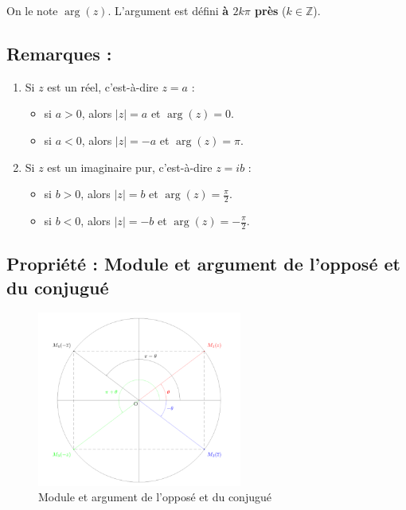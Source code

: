 \documentclass[a4paper,12pt]{article}
\begin{document}
    On le note $\arg(z)$. L’argument est défini \textbf{à $2k\pi$ près} ($k \in \mathbb{Z}$).

    \subsection{Remarques :}
    \begin{enumerate}
        \item Si $z$ est un réel, c’est-à-dire $z = a$ :
        \begin{itemize}
            \item si $a > 0$, alors $|z| = a$ et $\arg(z) = 0$.
            \item si $a < 0$, alors $|z| = -a$ et $\arg(z) = \pi$.
        \end{itemize}
        \item Si $z$ est un imaginaire pur, c’est-à-dire $z = ib$ :
        \begin{itemize}
            \item si $b > 0$, alors $|z| = b$ et $\arg(z) = \frac{\pi}{2}$.
            \item si $b < 0$, alors $|z| = -b$ et $\arg(z) = -\frac{\pi}{2}$.
        \end{itemize}
    \end{enumerate}

    \subsection{Propriété : Module et argument de l’opposé et du conjugué}

    \begin{figure}[h]
        \centering
        \includegraphics[width=0.6\textwidth]{figure_exemple_trigo.png}
        \caption{Module et argument de l’opposé et du conjugué}
        \label{fig:figure_exemple_trigo}
    \end{figure}
\end{document}
